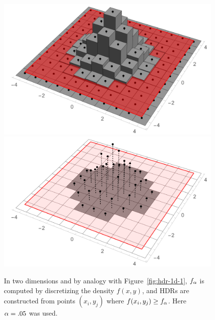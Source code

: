 \begin{figure}[h!]
  \includegraphics[scale=.3]{figures/hist-3.pdf}
  \includegraphics[scale=.3]{figures/hist-4.pdf} \\
  \caption{In two dimensions and by analogy with Figure~\ref{fig:hdr-1d-1}, $f_{\alpha}$ is computed by discretizing the density $f(x,y)$, and HDRs are constructed from points $(x_{i},y_{j})$ where $f(x_{i},y_{j}) \geq f_{\alpha}$. Here $\alpha = .05$ was used.}%
  \label{fig:hdr-2d-1}
\end{figure}


